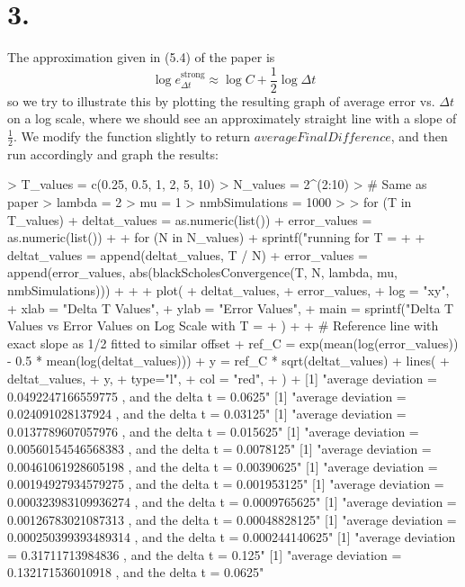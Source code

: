 \documentclass{article}
\begin{document}
{\Large 

\section*{3.}

The approximation given in (5.4) of the paper is 
\[
  \log{e^{\text{strong}}_{\Delta t}} \approx \log{C} + \frac{1}{2} \log{\Delta t}
\]
so we try to illustrate this by plotting the resulting graph of average error vs. \(\Delta t\) on a log scale, where we should see an approximately straight line with a slope of \(\frac{1}{2}\). We modify the function slightly to return \(averageFinalDifference\), and then run accordingly and graph the results:
\begin{spverbatim}
> T_values = c(0.25, 0.5, 1, 2, 5, 10)
> N_values = 2^(2:10)
> # Same as paper
> lambda = 2
> mu = 1
> nmbSimulations = 1000
> 
> for (T in T_values) {
+   deltat_values = as.numeric(list())
+   error_values = as.numeric(list())
+   
+   for (N in N_values) {
+     sprintf("running for T = %
+     
+     deltat_values = append(deltat_values, T / N)
+     error_values = append(error_values, abs(blackScholesConvergence(T, N, lambda, mu, nmbSimulations)))
+   }
+   
+   plot(
+     deltat_values,
+     error_values,
+     log = "xy",
+     xlab = "Delta T Values",
+     ylab = "Error Values",
+     main = sprintf("Delta T Values vs Error Values on Log Scale with T = %
+   )
+   
+   # Reference line with exact slope as 1/2 fitted to similar offset
+   ref_C = exp(mean(log(error_values)) - 0.5 * mean(log(deltat_values)))
+   y = ref_C * sqrt(deltat_values)
+   lines(
+     deltat_values,
+     y,
+     type="l",
+     col = "red",
+   )
+ }
[1] "average deviation =  0.0492247166559775 , and the delta t =  0.0625"
[1] "average deviation =  0.024091028137924 , and the delta t =  0.03125"
[1] "average deviation =  0.0137789607057976 , and the delta t =  0.015625"
[1] "average deviation =  0.00560154546568383 , and the delta t =  0.0078125"
[1] "average deviation =  0.00461061928605198 , and the delta t =  0.00390625"
[1] "average deviation =  0.00194927934579275 , and the delta t =  0.001953125"
[1] "average deviation =  0.000323983109936274 , and the delta t =  0.0009765625"
[1] "average deviation =  0.00126783021087313 , and the delta t =  0.00048828125"
[1] "average deviation =  0.000250399393489314 , and the delta t =  0.000244140625"
[1] "average deviation =  0.31711713984836 , and the delta t =  0.125"
[1] "average deviation =  0.132171536010918 , and the delta t =  0.0625"

\end{spverbatim}}
\end{document}
